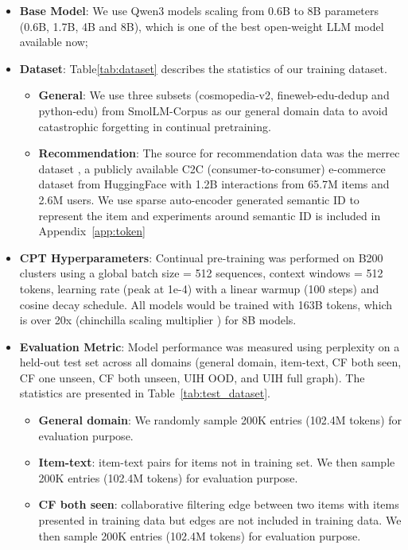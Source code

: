 \documentclass[]{fairmeta}
\begin{document}
\begin{itemize}
    \item \textbf{Base Model}: We use Qwen3 models scaling from 0.6B to 8B parameters (0.6B, 1.7B, 4B and 8B), which is one of the best open-weight LLM model available now;
    \item \textbf{Dataset}: Table\ref{tab:dataset}  describes the statistics of our training dataset. 
\begin{itemize}
    \item \textbf{General}: We use three subsets (cosmopedia-v2, fineweb-edu-dedup and python-edu) from SmolLM-Corpus \cite{smollm2024} as our general domain data to avoid catastrophic forgetting in continual pretraining. 
    \item \textbf{Recommendation}: The source for recommendation data was the merrec dataset \cite{merrec2024}, a publicly available C2C (consumer-to-consumer) e-commerce dataset from HuggingFace with 1.2B interactions from 65.7M items and 2.6M users. We use sparse auto-encoder generated semantic ID to represent the item and experiments around semantic ID is included in Appendix~\ref{app:token}
\end{itemize}   
    \item \textbf{CPT Hyperparameters}: Continual pre-training was performed on B200 clusters using a global batch size = 512 sequences, context windows = 512 tokens, learning rate (peak at 1e-4) with a linear warmup (100 steps) and cosine decay schedule. All models would be trained with 163B tokens, which is over 20x (chinchilla scaling multiplier \cite{hoffmann2022training}) for 8B models.
    \item \textbf{Evaluation Metric}: Model performance was measured using perplexity on a held-out test set across all domains (general domain, item-text, CF both seen, CF one unseen, CF both unseen, UIH OOD, and UIH full graph). The statistics are presented in Table~\ref{tab:test_dataset}.
\begin{itemize}
    \item \textbf{General domain}: We randomly sample 200K entries (102.4M tokens) for evaluation purpose.
    \item \textbf{Item-text}: item-text pairs for items not in training set. We then sample 200K entries (102.4M tokens) for evaluation purpose.
    \item \textbf{CF both seen}: collaborative filtering edge between two items with items presented in training data but edges are not included in training data. We then sample 200K entries (102.4M tokens) for evaluation purpose.

\end{itemize}
\end{itemize}
\end{document}
